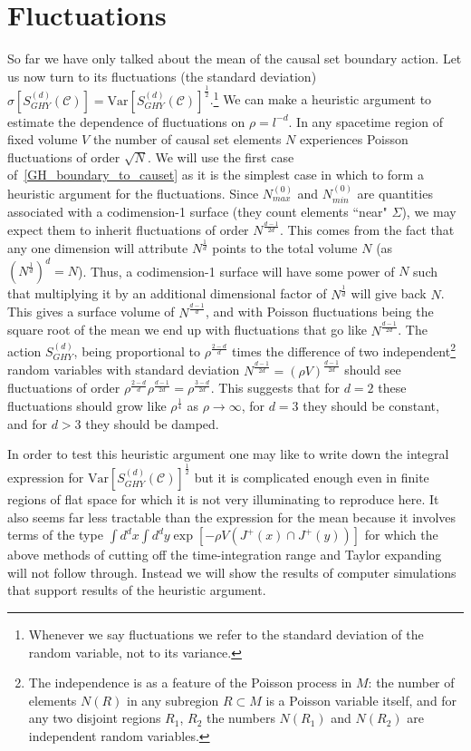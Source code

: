 \documentclass[12pt]{article}
\begin{document}
\section{Fluctuations}
So far we have only talked about the mean of the causal set boundary action. Let us now turn to its fluctuations (the standard deviation) $\sigma[S^{(d)}_{GHY}(\mathcal C)]=\text{Var}[S^{(d)}_{GHY}(\mathcal C)]^\frac12$.\footnote{Whenever we say fluctuations we refer to the standard deviation of the random variable, not to its variance.} We can make a heuristic argument to estimate the dependence of fluctuations on $\rho=l^{-d}$. In any spacetime region of fixed volume $V$ the number of causal set elements $N$ experiences Poisson fluctuations of order $\sqrt N$. We will use the first case of~\eqref{GH_boundary_to_causet} as it is the simplest case in which to form a heuristic argument for the fluctuations. Since $N_{max}^{(0)}$ and $N_{min}^{(0)}$ are quantities associated with a codimension-1 surface (they count elements ``near" $\Sigma$), we may expect them to inherit fluctuations of order $N^\frac{d-1}{2d}$. This comes from the fact that any one dimension will attribute $N^{\frac{1}{d}}$ points to the total volume $N$ (as $(N^{\frac{1}{d}} )^d=N$). Thus, a codimension-1 surface will have some power of $N$ such that multiplying it by an additional dimensional factor of $N^{\frac{1}{d}}$ will give back $N$. This gives a surface volume of $N^\frac{d-1}{d}$, and with Poisson fluctuations being the square root of the mean we end up with fluctuations that go like $N^\frac{d-1}{2d}$.
The action $S^{(d)}_{GHY}$, being proportional to $\rho^\frac{2-d}{d}$ times the difference of two independent\footnote{The independence is as a feature of the Poisson process in $M$: the number of elements $N(R)$ in any subregion $R\subset M$ is a Poisson variable itself, and for any two disjoint regions $R_1$, $R_2$ the numbers $N(R_1)$ and $N(R_2)$ are independent random variables.} random variables with standard deviation $N^\frac{d-1}{2d} = (\rho V)^\frac{d-1}{2d}$ should see fluctuations of order $\rho^\frac{2-d}{d}\rho^\frac{d-1}{2d}=\rho^\frac{3-d}{2d}$. This suggests that for $d=2$ these fluctuations should grow like $\rho^{\frac{1}{4}}$ as $\rho\rightarrow\infty$, for $d=3$ they should be constant, and for $d>3$ they should be damped.

In order to test this heuristic argument one may like to write down the integral expression for $\text{Var}[S^{(d)}_{GHY}(\mathcal C)]^\frac12$ but it is complicated enough even in finite regions of flat space for which it is not very illuminating to reproduce here. It also seems far less tractable than the expression for the mean because it involves terms of the type $\int d^dx\int d^dy \exp\left[-\rho V(J^+(x)\cap J^+(y))\right]$ for which the above methods of cutting off the time-integration range and Taylor expanding will not follow through. Instead we will show the results of computer simulations that support results of the heuristic argument. 
 
\end{document}
